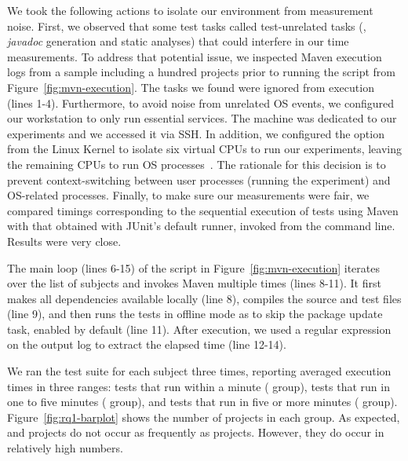 We took the following actions to isolate our environment from
measurement noise.
First, we observed that some test tasks called test-unrelated tasks
(\eg, \emph{javadoc} generation and static analyses) that could
interfere in our time measurements.
To address that potential issue, we inspected Maven execution logs
from a sample including a hundred projects prior to running the script
from Figure~\ref{fig:mvn-execution}.
The tasks we found were ignored from execution (lines 1-4).
Furthermore, to avoid noise from unrelated OS events, we configured
our workstation to only run essential services.
The machine was dedicated to our experiments and we
accessed it via SSH. In addition, we configured the 
option from the Linux Kernel \cite{linux-kernel} to isolate six
virtual CPUs to run our experiments, leaving the remaining CPUs to run
OS processes~\cite{isolcpus-use}.  The rationale for this decision is
to prevent context-switching between user processes (running the
experiment) and OS-related processes.  Finally, to make sure our
measurements were fair, we compared timings corresponding to the
sequential execution of tests using Maven with that obtained with
JUnit's default  runner, invoked from the command
line.  Results were very close.

The main loop (lines 6-15) of the script in
Figure~\ref{fig:mvn-execution} iterates over the list of subjects and
invokes Maven multiple times (lines 8-11).  It first makes all dependencies available locally
(line 8), compiles the source and test files (line 9), and then runs
the tests in offline mode as to skip the package update task, enabled
by default (line 11). After execution, we used a regular expression on
the output log to extract the elapsed time (line 12-14).


\vspace{-1ex}

We ran the test suite for each subject three times, reporting averaged
execution times in three ranges: tests that run within a minute
(\shortg{} group), tests that run in one to five minutes (\medg{}
group), and tests that run in five or more minutes (\longg{}
group).
Figure~\ref{fig:rq1-barplot} shows the number of projects in
each group.  As expected, \longg{} and \medg{} projects do not occur
as frequently as \shortg{} projects.  However, they do occur in
relatively high numbers.

